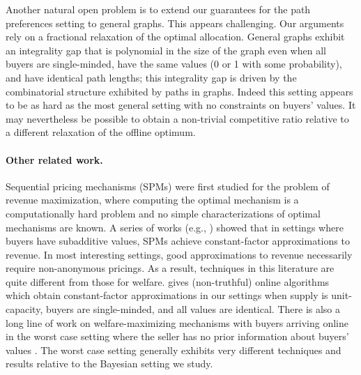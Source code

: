 Another natural open problem is to extend our guarantees for the path
preferences setting to general graphs. This appears challenging. Our
arguments rely on a fractional relaxation of the optimal
allocation. General graphs exhibit an integrality gap that is
polynomial in the size of the graph even when all buyers are
single-minded, have the same values (0 or 1 with some probability),
and have identical path lengths; this integrality gap is driven by the
combinatorial structure exhibited by paths in graphs. Indeed this
setting appears to be as hard as the most general setting with no
constraints on buyers' values. It may nevertheless be possible to obtain a
non-trivial competitive ratio relative to a different relaxation of
the offline optimum.


\paragraph{Other related work.}
Sequential pricing mechanisms (SPMs) were first studied for the problem of
revenue maximization, where computing the optimal mechanism is a
computationally hard problem and no simple characterizations of optimal
mechanisms are known. A series of works (e.g., \cite{CHK-07, BH-08, CHMS-10,
CMS-10, bilw-focs14, RW-15, CM-16, CZ-17}) showed that in settings where buyers
have subadditive values, SPMs achieve constant-factor approximations to
revenue. In most interesting settings, good approximations to revenue
necessarily require non-anonymous pricings. As a result, techniques in this
literature are quite different from those for welfare.  \cite{GHKSV14} gives
(non-truthful) online algorithms which obtain constant-factor approximations in
our settings when supply is unit-capacity, buyers are single-minded, and all
values are identical.  There is also a long line of work on welfare-maximizing
mechanisms with buyers arriving online in the worst case setting where the
seller has no prior information about buyers' values \citep{lavi2015online,
hajiaghayi2005online, cole2008prompt, azar2011prompt, azar2015truthful,
CDH+17}. The worst case setting generally exhibits very different techniques
and results relative to the Bayesian setting we study.



